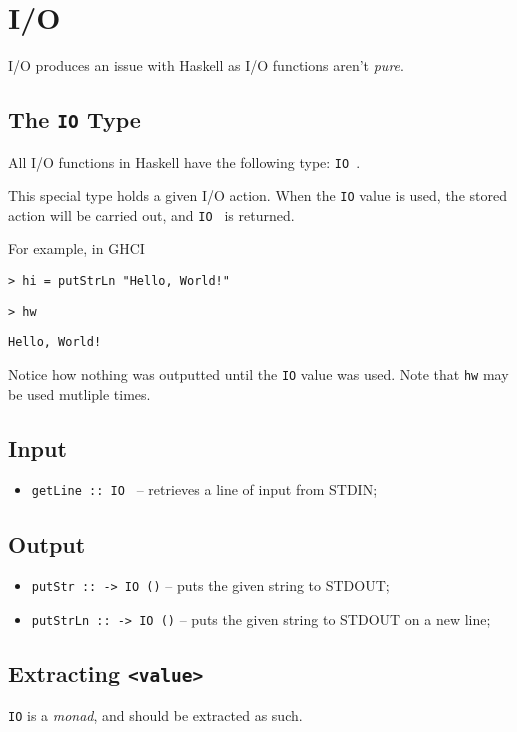 \section{I/O}

I/O produces an issue with Haskell as I/O functions aren't \textit{pure}.

\subsection{The \texttt{IO} Type}
All I/O functions in Haskell have the following type: \texttt{IO }.

This special type holds a given I/O action. When the \texttt{IO} value is used, the stored action will be carried out, and \texttt{IO } is returned.

For example, in GHCI

\texttt{> hi = putStrLn "Hello, World!"}

\texttt{> hw}

\texttt{Hello, World!}

Notice how nothing was outputted until the \texttt{IO} value was used. Note that \texttt{hw} may be used mutliple times.

\subsection{Input}
\begin{itemize}
  \item \texttt{getLine :: IO } -- retrieves a line of input from STDIN;
\end{itemize}

\subsection{Output}
\begin{itemize}
  \item \texttt{putStr ::  -> IO ()} -- puts the given string to STDOUT;
  \item \texttt{putStrLn ::  -> IO ()} -- puts the given string to STDOUT on a new line;
\end{itemize}

\subsection{Extracting \texttt{<value>}}
\texttt{IO} is a \textit{monad}, and should be extracted as such.

